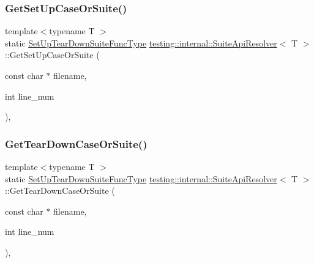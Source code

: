 \mbox{\label{structtesting_1_1internal_1_1_suite_api_resolver_abae647b1fed9422fc596fd385de6dd5b}} 
\subsubsection{\texorpdfstring{GetSetUpCaseOrSuite()}{GetSetUpCaseOrSuite()}\hspace{0.1cm}{\footnotesize\ttfamily [2/2]}}
{\footnotesize\ttfamily template$<$typename T $>$ \\
static \mbox{\hyperlink{namespacetesting_1_1internal_a754d337f5d643225115fb28f6b1d6fb1}{Set\+Up\+Tear\+Down\+Suite\+Func\+Type}} \mbox{\hyperlink{structtesting_1_1internal_1_1_suite_api_resolver}{testing\+::internal\+::\+Suite\+Api\+Resolver}}$<$ T $>$\+::Get\+Set\+Up\+Case\+Or\+Suite (\begin{DoxyParamCaption}\item[{const char $\ast$}]{filename,  }\item[{int}]{line\+\_\+num }\end{DoxyParamCaption})\hspace{0.3cm}{\ttfamily [inline]}, {\ttfamily [static]}}

\mbox{\label{structtesting_1_1internal_1_1_suite_api_resolver_a60e647dc7974c2e834812c491cbbca25}} 
\subsubsection{\texorpdfstring{GetTearDownCaseOrSuite()}{GetTearDownCaseOrSuite()}\hspace{0.1cm}{\footnotesize\ttfamily [1/2]}}
{\footnotesize\ttfamily template$<$typename T $>$ \\
static \mbox{\hyperlink{namespacetesting_1_1internal_a754d337f5d643225115fb28f6b1d6fb1}{Set\+Up\+Tear\+Down\+Suite\+Func\+Type}} \mbox{\hyperlink{structtesting_1_1internal_1_1_suite_api_resolver}{testing\+::internal\+::\+Suite\+Api\+Resolver}}$<$ T $>$\+::Get\+Tear\+Down\+Case\+Or\+Suite (\begin{DoxyParamCaption}\item[{const char $\ast$}]{filename,  }\item[{int}]{line\+\_\+num }\end{DoxyParamCaption})\hspace{0.3cm}{\ttfamily [inline]}, {\ttfamily [static]}}

